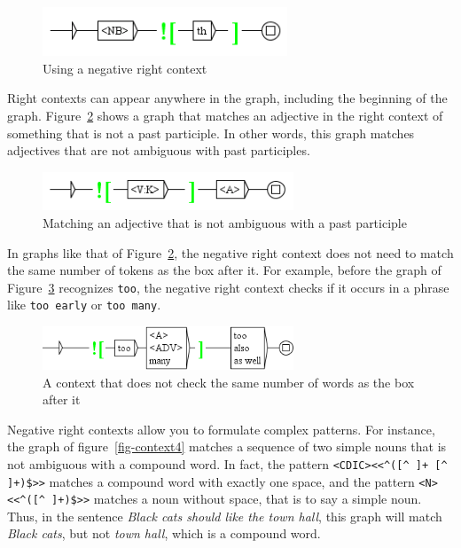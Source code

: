 \begin{figure}[!h]
\begin{center}
\includegraphics[width=7.3cm]{resources/img/fig6-13.png}
\caption{Using a negative right context\label{fig-context2}}
\end{center}
\end{figure}

\bigskip
\noindent Right contexts can appear anywhere in the graph, including the
beginning of the graph. Figure~\ref{fig-context3} shows a graph that matches an
adjective in the right context of something that is not a past participle. In other words, this
graph matches adjectives that are not ambiguous with past participles.

\begin{figure}[!h]
\begin{center}
\includegraphics[width=7.5cm]{resources/img/fig6-14.png}
\caption{Matching an adjective that is not ambiguous with a past
participle\label{fig-context3}}
\end{center}
\end{figure}

\bigskip
\noindent In graphs like that of Figure~\ref{fig-context3}, the negative right context does not
need to match the same number of tokens as the box after it. For example, before
the graph of Figure~\ref{too-also} recognizes \verb+too+, the negative right context checks if
it occurs in a phrase like \verb+too early+ or \verb+too many+.

\begin{figure}[!h]
\begin{center}
\includegraphics[width=7.5cm]{resources/img/fig-too-also.png}
\caption{A context that does not check the same number of words as the box after it\label{too-also}}
\end{center}
\end{figure}

\bigskip
\noindent Negative right contexts allow you to formulate complex patterns. For
instance, the graph of figure~\ref{fig-context4} matches a sequence of two 
simple nouns that is not ambiguous with a compound word. In fact, the 
pattern \verb?<CDIC><<^([^ ]+ [^ ]+)$>>? 
matches a compound word with exactly one space, and the pattern 
\verb?<N><<^([^ ]+)$>>? matches a noun without space, that is to say a simple 
noun. Thus, in the sentence \textit{Black cats should like the town hall}, 
this graph will match \textit{Black cats}, but not \textit{town hall}, which is
a compound word.


